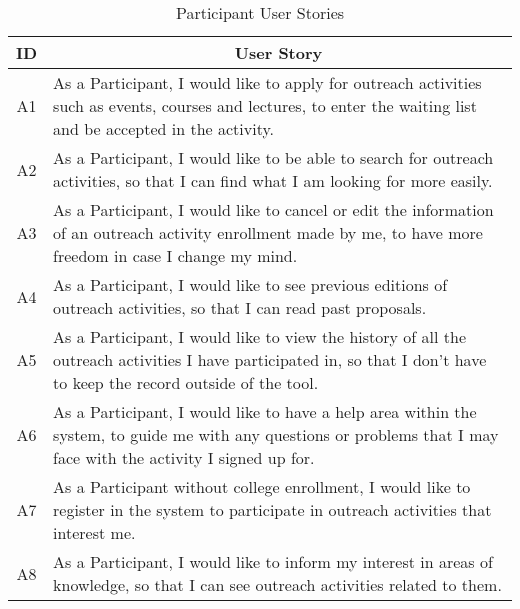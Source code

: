 \begin{table}[!htb]
  \centering
  \setlength{\aboverulesep}{0pt}
  \setlength{\belowrulesep}{0pt}
  \caption{Participant User Stories}
  \label{tab:participant-user-stories}
  \footnotesize
  \begin{tabularx}{\textwidth}{c|X}
    \toprule
    \rowcolor[rgb]{0.753,0.753,0.753} \textbf{ID} & \multicolumn{1}{c}{\textbf{User Story}}                    \\
    \hline
    \rowcolor[rgb]{0.898,0.898,0.898} A1          & As a Participant, I would like to apply for outreach activities such as events, courses and lectures, to enter the waiting list and be accepted in the activity.                                          \\
    A2                                            & As a Participant, I would like to be able to search for outreach activities, so that I can find what I am looking for more easily.                                     \\
    \rowcolor[rgb]{0.898,0.898,0.898} A3          & As a Participant, I would like to cancel or edit the information of an outreach activity enrollment made by me, to have more freedom in case I change my mind.                                \\
    A4                                            & As a Participant, I would like to see previous editions of outreach activities, so that I can read past proposals.                              \\
    \rowcolor[rgb]{0.898,0.898,0.898} A5          & As a Participant, I would like to view the history of all the outreach activities I have participated in, so that I don't have to keep the record outside of the tool.                                \\
    A6                                            & As a Participant, I would like to have a help area within the system, to guide me with any questions or problems that I may face with the activity I signed up for.                              \\
    \rowcolor[rgb]{0.898,0.898,0.898} A7          & As a Participant without college enrollment, I would like to register in the system to participate in outreach activities that interest me.                                \\
    A8                                            & As a Participant, I would like to inform my interest in areas of knowledge, so that I can see outreach activities related to them.                              \\

\end{tabularx}
\end{table}
